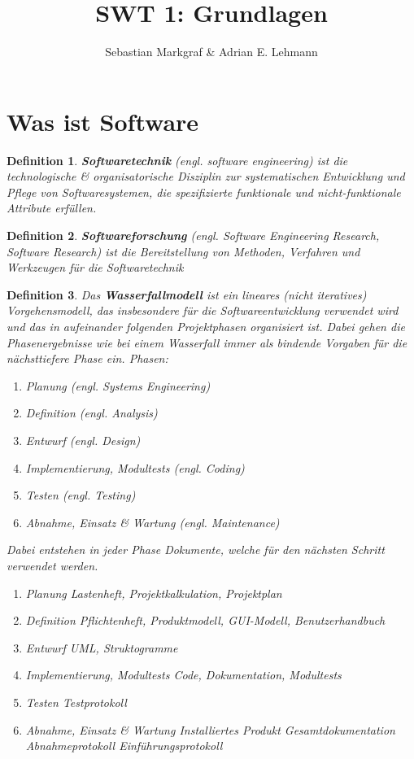 \documentclass[a4paper]{article}
\title{SWT 1: Grundlagen}
\author{Sebastian Markgraf \& Adrian E. Lehmann}
\theoremstyle{break}
\newtheorem{defi}{Definition}[section]
\begin{document}
\maketitle
\section {Was ist Software}
\begin {defi}
  \textbf{Softwaretechnik} (engl. software engineering) ist die technologische \& organisatorische Disziplin zur systematischen Entwicklung und Pflege von Softwaresystemen, die spezifizierte funktionale und nicht-funktionale Attribute erfüllen.
\end {defi}

\begin {defi}
  \textbf{Softwareforschung} (engl. Software Engineering Research, Software Research) ist die Bereitstellung von Methoden, Verfahren und Werkzeugen für die Softwaretechnik
\end {defi}


\begin {defi}
  Das \textbf{Wasserfallmodell} ist ein lineares (nicht iteratives) Vorgehensmodell, das insbesondere für die Softwareentwicklung verwendet wird und das in aufeinander folgenden Projektphasen organisiert ist. Dabei gehen die Phasenergebnisse wie bei einem Wasserfall immer als bindende Vorgaben für die nächsttiefere Phase ein. \newline
  Phasen:
  \begin {enumerate}
  \item Planung (\textit{engl. Systems Engineering})
  \item Definition (\textit{engl. Analysis})
  \item Entwurf (\textit{engl. Design})
  \item Implementierung, Modultests (\textit{engl. Coding})
  \item Testen (\textit{engl. Testing})
  \item Abnahme, Einsatz \& Wartung (\textit{engl. Maintenance})
  \end {enumerate}
  Dabei entstehen in jeder Phase Dokumente, welche für den nächsten Schritt verwendet werden.
  \begin {enumerate}
  \item Planung
	  \subitem Lastenheft, Projektkalkulation, Projektplan
  \item Definition
	  \subitem Pflichtenheft, Produktmodell, GUI-Modell, Benutzerhandbuch
  \item Entwurf
	  \subitem UML, Struktogramme
  \item Implementierung, Modultests
	  \subitem Code, Dokumentation, Modultests
  \item Testen
	  \subitem Testprotokoll
  \item Abnahme, Einsatz \& Wartung
	  \subitem Installiertes Produkt
	  \subitem Gesamtdokumentation
	  \subitem Abnahmeprotokoll
      \subitem Einführungsprotokoll
    \end {enumerate}
\end {defi}
\end{document}
